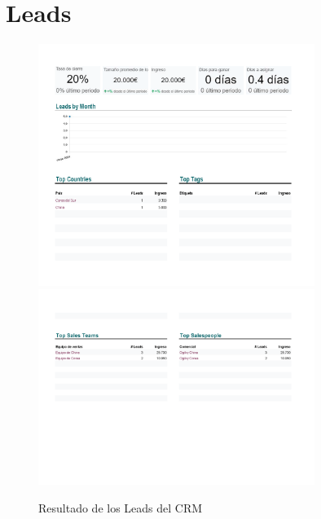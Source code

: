 \documentclass{report}
\begin{document}
        \section*{Leads}
            \begin{figure}[H]
                \centering
                \includegraphics[width=0.8\textwidth]{./img/Leads1.png}
                \includegraphics[width=0.8\textwidth]{./img/Leads2.png}
                \caption{Resultado de los Leads del CRM}
            \end{figure}
\end{document}
